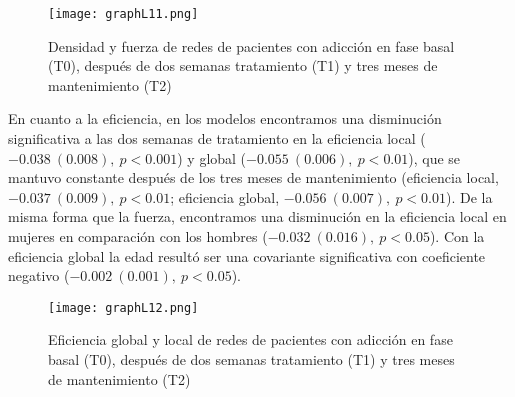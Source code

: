 \begin{figure}[!htb]
    \centering
    \texttt{[image: graphL11.png]}
    \caption{Densidad y fuerza de redes de pacientes con adicción en fase basal (T0), después de dos semanas tratamiento (T1) y tres meses de mantenimiento (T2)}
    \label{fig:gpL11}
\end{figure}

En cuanto a la eficiencia, en los modelos encontramos una disminución significativa a las dos semanas de tratamiento en la eficiencia local ($-0.038\ (0.008),\ p<0.001$) y global ($-0.055\ (0.006),\ p<0.01$), que se mantuvo constante después de los tres meses de mantenimiento (eficiencia local, $-0.037\ (0.009),\ p<0.01$; eficiencia global, $-0.056\ (0.007),\ p<0.01$). De la misma forma que la fuerza, encontramos una disminución en la eficiencia local en mujeres en comparación con los hombres ($-0.032\ (0.016),\ p<0.05$). Con la eficiencia global la edad resultó ser una covariante significativa con coeficiente negativo ($-0.002\ (0.001),\ p<0.05$).

\begin{figure}[!htb]
    \centering
    \texttt{[image: graphL12.png]}
    \caption{Eficiencia global y local de redes de pacientes con adicción en fase basal (T0), después de dos semanas tratamiento (T1) y tres meses de mantenimiento (T2)}
    \label{fig:gpL12}
\end{figure}


